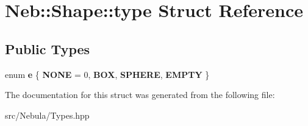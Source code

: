 \hypertarget{structNeb_1_1Shape_1_1type}{\section{\-Neb\-:\-:\-Shape\-:\-:type \-Struct \-Reference}
\label{structNeb_1_1Shape_1_1type}
}
\subsection*{\-Public \-Types}
\begin{DoxyCompactItemize}
\item 
enum {\bfseries e} \{ {\bfseries \-N\-O\-N\-E} =  0, 
{\bfseries \-B\-O\-X}, 
{\bfseries \-S\-P\-H\-E\-R\-E}, 
{\bfseries \-E\-M\-P\-T\-Y}
 \}
\end{DoxyCompactItemize}


\-The documentation for this struct was generated from the following file\-:\begin{DoxyCompactItemize}
\item 
src/\-Nebula/\-Types.\-hpp\end{DoxyCompactItemize}
